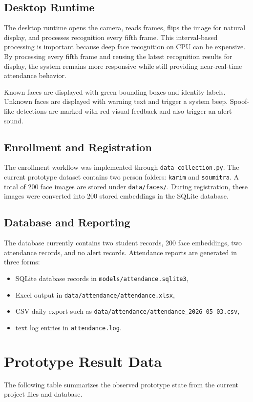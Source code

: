 \documentclass[12pt,a4paper]{report}
\newcommand{\JustifiedNormal}{\fontsize{12}{14}\selectfont\justifying\setlength{\parindent}{0pt}}
\begin{document}
\subsection{Desktop Runtime}
\JustifiedNormal
The desktop runtime opens the camera, reads frames, flips the image for natural display, and processes recognition every fifth frame. This interval-based processing is important because deep face recognition on CPU can be expensive. By processing every fifth frame and reusing the latest recognition results for display, the system remains more responsive while still providing near-real-time attendance behavior.

Known faces are displayed with green bounding boxes and identity labels. Unknown faces are displayed with warning text and trigger a system beep. Spoof-like detections are marked with red visual feedback and also trigger an alert sound.

\subsection{Enrollment and Registration}
\JustifiedNormal
The enrollment workflow was implemented through \texttt{data\_collection.py}. The current prototype dataset contains two person folders: \texttt{karim} and \texttt{soumitra}. A total of 200 face images are stored under \texttt{data/faces/}. During registration, these images were converted into 200 stored embeddings in the SQLite database.

\subsection{Database and Reporting}
\JustifiedNormal
The database currently contains two student records, 200 face embeddings, two attendance records, and no alert records. Attendance reports are generated in three forms:

\begin{itemize}[leftmargin=*]
  \item SQLite database records in \texttt{models/attendance.sqlite3},
  \item Excel output in \texttt{data/attendance/attendance.xlsx},
  \item CSV daily export such as \texttt{data/attendance/attendance\_2026-05-03.csv},
  \item text log entries in \texttt{attendance.log}.
\end{itemize}

\section{Prototype Result Data}
\JustifiedNormal
The following table summarizes the observed prototype state from the current project files and database.
\end{document}
